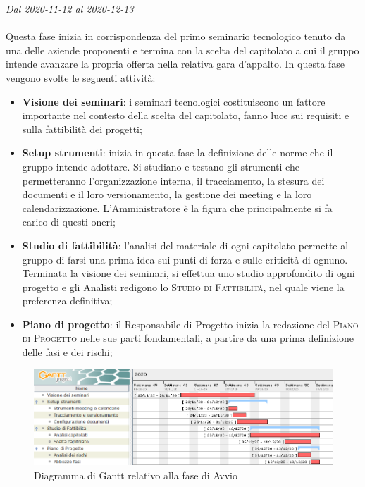 \textit{Dal 2020-11-12 al 2020-12-13}
\\\\
Questa fase inizia in corrispondenza del primo seminario tecnologico tenuto da una delle aziende proponenti e termina con la scelta del capitolato a cui il gruppo intende avanzare la propria offerta nella relativa gara d'appalto.
In questa fase vengono svolte le seguenti attività:
\begin{itemize}
	\item \textbf{Visione dei seminari}: i seminari tecnologici costituiscono un fattore importante nel contesto della scelta del capitolato, fanno luce sui requisiti e sulla fattibilità dei progetti;
	\item \textbf{Setup strumenti}: inizia in questa fase la definizione delle norme che il gruppo intende adottare. Si studiano e testano gli strumenti che permetteranno l'organizzazione interna, il tracciamento, la stesura dei documenti e il loro versionamento, la gestione dei meeting e la loro calendarizzazione. L'Amministratore è la figura che principalmente si fa carico di questi oneri;
	\item \textbf{Studio di fattibilità}: l'analisi del materiale di ogni capitolato permette al gruppo di farsi una prima idea sui punti di forza e sulle criticità di ognuno. Terminata la visione dei seminari, si effettua uno studio approfondito di ogni progetto e gli Analisti redigono lo \textsc{Studio di Fattibilità}, nel quale viene la preferenza definitiva;
	\item \textbf{Piano di progetto}: il Responsabile di Progetto inizia la redazione del \textsc{Piano di Progetto} nelle sue parti fondamentali, a partire da una prima definizione delle fasi e dei rischi;
\end{itemize}  


\begin{figure}[H]
	\centering
	\includegraphics[scale=0.62]{res/images/01_gantt_avvio.png}
	\caption{Diagramma di Gantt relativo alla fase di Avvio}
\end{figure}





